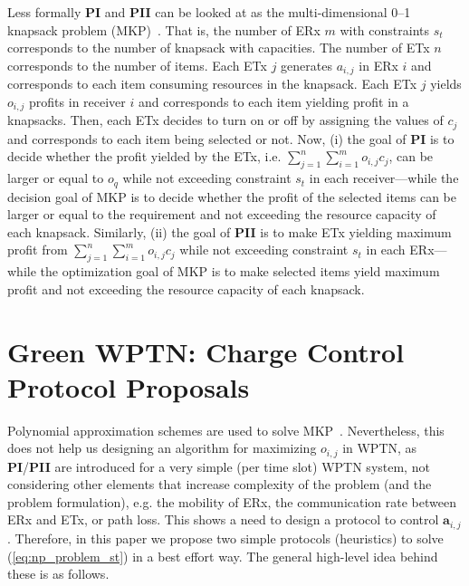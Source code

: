 \documentclass[11pt,draftclsnofoot,journal,onecolumn]{IEEEtran}
\begin{document}
Less formally \textbf{PI} and \textbf{PII} can be looked at as the multi-dimensional 0--1 knapsack problem (MKP)~\cite{freville2004multidimensional}. That is, the number of ERx $m$ with constraints $s_t$ corresponds to the number of knapsack with capacities. The number of ETx $n$ corresponds to the number of items. Each ETx $j$ generates $a_{i,j}$ in ERx $i$ and corresponds to each item consuming resources in the knapsack. Each ETx $j$ yields $o_{i,j}$ profits in receiver $i$ and corresponds to each item yielding profit in a knapsacks. Then, each ETx decides to turn on or off by assigning the values of $c_j$ and corresponds to each item being selected or not. Now, (i) the goal of \textbf{PI} is to decide whether the profit yielded by the ETx, i.e. $\sum\nolimits_{j = 1}^n \sum\nolimits_{i = 1}^m o_{i,j}c_{j}$, can be larger or equal to $o_q$ while not exceeding constraint $s_t$ in each receiver---while the decision goal of MKP is to decide whether the profit of the selected items can be larger or equal to the requirement and not exceeding the resource capacity of each knapsack. Similarly, (ii) the goal of \textbf{PII} is to make ETx yielding maximum profit from $\sum\nolimits_{j = 1}^n \sum\nolimits_{i = 1}^m o_{i,j}c_{j}$ while not exceeding constraint $s_t$ in each ERx---while the optimization goal of MKP is to make selected items yield maximum profit and not exceeding the resource capacity of each knapsack.

\section{Green WPTN: Charge Control Protocol Proposals}
\label{sec:charger_energy_saving_protocol}

Polynomial approximation schemes are used to solve MKP~\cite[Sec. 3.1]{freville2004multidimensional}. Nevertheless, this does not help us designing an algorithm for maximizing $o_{i,j}$ in WPTN, as \textbf{PI}/\textbf{PII} are introduced for a very simple (per time slot) WPTN system, not considering other elements that increase complexity of the problem (and the problem formulation), e.g. the mobility of ERx, the communication rate between ERx and ETx, or path loss. This shows a need to design a protocol to control $\mathbf{a}_{i,j}$. Therefore, in this paper we propose two simple protocols (heuristics) to solve (\ref{eq:np_problem_st}) in a best effort way. The general high-level idea behind these is as follows.
\end{document}
